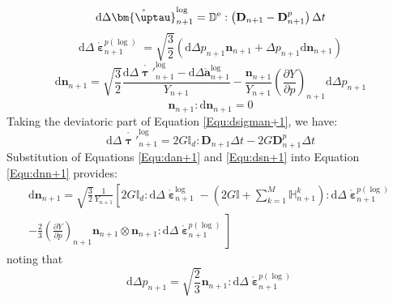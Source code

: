 \begin{equation}
\label{Equ:dsigman+1}
{\text{d}}\Delta \mathring {\bm{\uptau}}_{n + 1}^{\log } = {\mathbb{D}^{\rm{e}}}:\left( \mathbf{D}_{n+1} - \mathbf{D}_{n+1}^{p} \right) \Delta t
\end{equation}
\begin{equation}
\label{Equ:depsilon+1}
{\text{d}}\Delta \mathring {\bm{\upepsilon}}_{n + 1}^{p(\log) } = \sqrt {\frac{3}{2}} \left( {{\text{d}}\Delta {p_{n + 1}}{{\mathbf{n}}_{n + 1}} + \Delta {p_{n + 1}}{\text{d}}{{\mathbf{n}}_{n + 1}}} \right)
\end{equation}
\begin{equation}
\label{Equ:dnn+1}
{\text{d}}{{\mathbf{n}}_{n + 1}} = \sqrt {\frac{3}{2}} \frac{{{\text{d}}\Delta \mathring {{\bm{\uptau}}'}_{n + 1}^{\log } - {\text{d}}\Delta \mathring {\mathbf{a}}_{n + 1}^{\log } }}{{{Y_{n + 1}}}} - \frac{{{{\mathbf{n}}_{n + 1}}}}{{{Y_{n + 1}}}}{\left( {\frac{{\partial Y}}{{\partial p}}} \right)_{n + 1}}{\text{d}}\Delta {p_{n + 1}}
\end{equation}
\begin{equation}
{{\mathbf{n}}_{n + 1}}:{\text{d}}{{\mathbf{n}}_{n + 1}} = 0
\end{equation}
Taking the deviatoric part of Equation \ref{Equ:dsigman+1}, we have:
\begin{equation}
\label{Equ:dsn+1}
{\text{d}}\Delta \mathring {{\bm{\uptau}}'}_{n + 1}^{\log }  = 2G{\mathbb{I}_d}:\mathbf{D}_{n+1} \Delta t - 2G\mathbf{D}_{n+1}^p \Delta t
\end{equation}
Substitution of Equations \ref{Equ:dan+1} and \ref{Equ:dsn+1} into Equation \ref{Equ:dnn+1} provides:
\begin{equation}
\label{Equ:dnn+12}
\begin{aligned}
{\text{d}}{{\mathbf{n}}_{n + 1}} = \sqrt {\frac{3}{2}} \frac{1}{{{Y_{n + 1}}}} \left[ {2G{\mathbb{I}_d}:{\text{d}}\Delta \mathring {\bm{\upepsilon}}_{n + 1}^{\log } - \left( {2G\mathbb{I} + \sum\limits_{k = 1}^M {\mathbb{H}_{n + 1}^k} } \right):{\text{d}}\Delta \mathring {\bm{\upepsilon}}_{n + 1}^{p(\log) } } \right.\\
\left. { - \frac{2}{3}{{\left( {\frac{{\partial Y}}{{\partial p}}} \right)}_{n + 1}}{{\mathbf{n}}_{n + 1}} \otimes {{\mathbf{n}}_{n + 1}}:{\text{d}}\Delta \mathring {\bm{\upepsilon}}_{n + 1}^{p(\log) }}\right]
\end{aligned}
\end{equation}
noting that
\begin{equation}
\label{Equ:dpn+1}
{\text{d}}\Delta {p_{n + 1}} = \sqrt {\frac{2}{3}} {{\mathbf{n}}_{n + 1}}:{\text{d}}\Delta \mathring {\bm{\upepsilon}}_{n + 1}^{p(\log) }
\end{equation}
